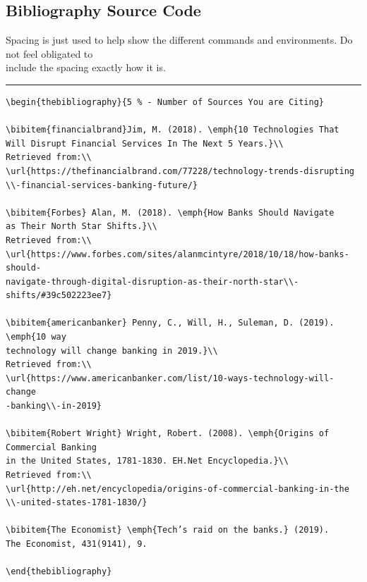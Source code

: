 \subsection{Bibliography Source Code}
Spacing is just used to help show the different commands and environments. Do not feel obligated to\\
include the spacing exactly how it is.\\
\hrule
	\vspace{4mm}
\begin{verbatim}
\begin{thebibliography}{5 % - Number of Sources You are Citing}

\bibitem{financialbrand}Jim, M. (2018). \emph{10 Technologies That 
Will Disrupt Financial Services In The Next 5 Years.}\\
Retrieved from:\\
\url{https://thefinancialbrand.com/77228/technology-trends-disrupting
\\-financial-services-banking-future/}

\bibitem{Forbes} Alan, M. (2018). \emph{How Banks Should Navigate
as Their North Star Shifts.}\\
Retrieved from:\\ 
\url{https://www.forbes.com/sites/alanmcintyre/2018/10/18/how-banks-should-
navigate-through-digital-disruption-as-their-north-star\\-shifts/#39c502223ee7}

\bibitem{americanbanker} Penny, C., Will, H., Suleman, D. (2019). \emph{10 way 
technology will change banking in 2019.}\\
Retrieved from:\\ 
\url{https://www.americanbanker.com/list/10-ways-technology-will-change
-banking\\-in-2019}

\bibitem{Robert Wright} Wright, Robert. (2008). \emph{Origins of Commercial Banking
in the United States, 1781-1830. EH.Net Encyclopedia.}\\
Retrieved from:\\							
\url{http://eh.net/encyclopedia/origins-of-commercial-banking-in-the
\\-united-states-1781-1830/}

\bibitem{The Economist} \emph{Tech’s raid on the banks.} (2019). 
The Economist, 431(9141), 9.

\end{thebibliography}
\end{verbatim}
\newpage
{}
